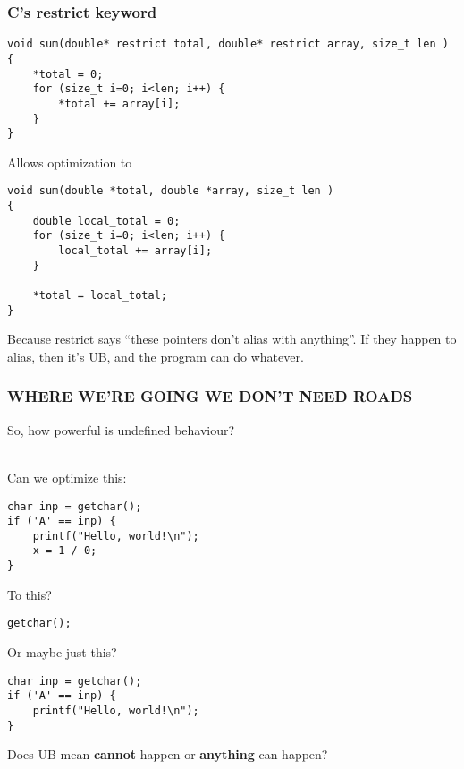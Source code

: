 \documentclass{beamer}
\begin{document}
\begin{frame}[fragile]
  \frametitle{C's restrict keyword}

\begin{lstlisting}
void sum(double* restrict total, double* restrict array, size_t len )
{
    *total = 0;
    for (size_t i=0; i<len; i++) {
        *total += array[i];
    }
}
\end{lstlisting}

  Allows optimization to

\begin{lstlisting}
void sum(double *total, double *array, size_t len )
{
    double local_total = 0;
    for (size_t i=0; i<len; i++) {
        local_total += array[i];
    }

    *total = local_total;
}
\end{lstlisting}

  Because restrict says ``these pointers don't alias with
  anything''. If they happen to alias, then it's UB, and the program
  can do whatever.

\end{frame}

\begin{frame}
  \frametitle{WHERE WE'RE GOING WE DON'T NEED ROADS}

  \pause
  So, how powerful is undefined behaviour?\\~

  \pause
  Can we optimize this:

\begin{lstlisting}
char inp = getchar();
if ('A' == inp) {
    printf("Hello, world!\n");
    x = 1 / 0;
}
\end{lstlisting}

  \pause

  To this?

\begin{lstlisting}
getchar();
\end{lstlisting}

  \pause

  Or maybe just this?

\begin{lstlisting}
char inp = getchar();
if ('A' == inp) {
    printf("Hello, world!\n");
}
\end{lstlisting}

  \pause

  Does UB mean {\bf cannot} happen or {\bf anything} can happen?

\end{frame}
\end{document}
